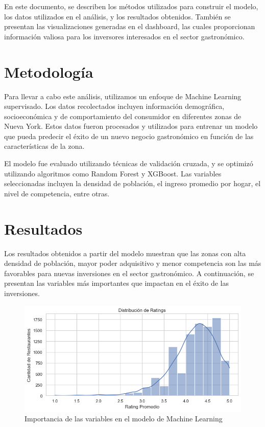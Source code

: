 \documentclass[twoside,11pt]{article}
\begin{document}
En este documento, se describen los métodos utilizados para construir el modelo, los datos utilizados en el análisis, y los resultados obtenidos. También se presentan las visualizaciones generadas en el dashboard, las cuales proporcionan información valiosa para los inversores interesados en el sector gastronómico.

\section{Metodología}

Para llevar a cabo este análisis, utilizamos un enfoque de Machine Learning supervisado. Los datos recolectados incluyen información demográfica, socioeconómica y de comportamiento del consumidor en diferentes zonas de Nueva York. Estos datos fueron procesados y utilizados para entrenar un modelo que pueda predecir el éxito de un nuevo negocio gastronómico en función de las características de la zona.

El modelo fue evaluado utilizando técnicas de validación cruzada, y se optimizó utilizando algoritmos como Random Forest y XGBoost. Las variables seleccionadas incluyen la densidad de población, el ingreso promedio por hogar, el nivel de competencia, entre otras.

\section{Resultados}

Los resultados obtenidos a partir del modelo muestran que las zonas con alta densidad de población, mayor poder adquisitivo y menor competencia son las más favorables para nuevas inversiones en el sector gastronómico. A continuación, se presentan las variables más importantes que impactan en el éxito de las inversiones.

\begin{figure}[h] 
    \centering
    \includegraphics[width=1\textwidth]{importancia_variables.png} 
    \caption{Importancia de las variables en el modelo de Machine Learning}
    \label{fig:importancia_variables} 
\end{figure}
\end{document}

